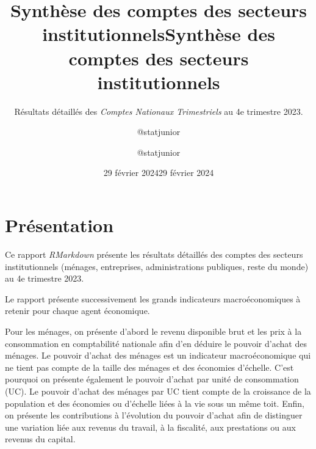 \documentclass[
  paper=a4,
  ,captions=tableheading
]{scrartcl}
\title{Synthèse des comptes des secteurs institutionnels}
\subtitle{Résultats détaillés des \emph{Comptes Nationaux Trimestriels}
au 4e trimestre 2023.}
\author{@statjunior}
\date{29 février 2024}
\title{Synthèse des comptes des secteurs institutionnels}
\author{@statjunior}
\date{29 février 2024}
\begin{document}
\begin{titlepage}
\afterpage{\restorepagecolor}
\newcommand{\colorRule}[3][black]{\textcolor[HTML]{#1}{\rule{#2}{#3}}}
\end{titlepage}
\restoregeometry
{} 




\hypertarget{pruxe9sentation}{%
\section{Présentation}\label{pruxe9sentation}}

Ce rapport \emph{RMarkdown} présente les résultats détaillés des comptes
des secteurs institutionnels (ménages, entreprises, administrations
publiques, reste du monde) au 4e trimestre 2023.

Le rapport présente successivement les grands indicateurs
macroéconomiques à retenir pour chaque agent économique.

Pour les ménages, on présente d'abord le revenu disponible brut et les
prix à la consommation en comptabilité nationale afin d'en déduire le
pouvoir d'achat des ménages. Le pouvoir d'achat des ménages est un
indicateur macroéconomique qui ne tient pas compte de la taille des
ménages et des économies d'échelle. C'est pourquoi on présente également
le pouvoir d'achat par unité de consommation (UC). Le pouvoir d'achat
des ménages par UC tient compte de la croissance de la population et des
économies ou d'échelle liées à la vie sous un même toit. Enfin, on
présente les contributions à l'évolution du pouvoir d'achat afin de
distinguer une variation liée aux revenus du travail, à la fiscalité,
aux prestations ou aux revenus du capital.
\end{document}
